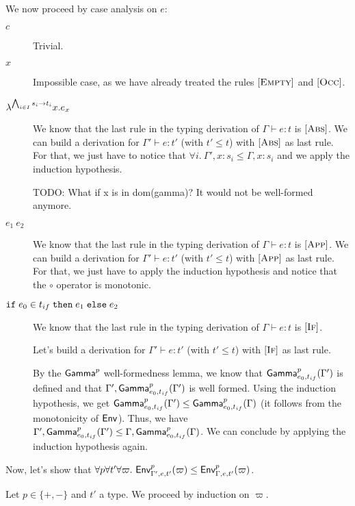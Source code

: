 \documentclass[a4paper]{article}
\theoremstyle{definition}
\begin{document}
        We now proceed by case analysis on $e$:
        \begin{description}
          \item[$c$] Trivial.
          \item[$x$] Impossible case, as we have already treated the rules $[\textsc{Empty}]$ and $[\textsc{Occ}]$.
          \item[$\lambda^{\bigwedge_{i\in I} s_i\to t_i}x.e_x$] We know that the last rule in the typing derivation of $\Gamma \vdash e:t$ is $[\textsc{Abs}]$.
          We can build a derivation for $\Gamma' \vdash e:t'$ (with $t'\leq t$) with $[\textsc{Abs}]$ as last rule.
          For that, we just have to notice that $\forall i.\ \Gamma',x:s_i \leq \Gamma,x:s_i$ and we apply the induction hypothesis.
          
          TODO: What if x is in dom(gamma)? It would not be well-formed anymore.

          \item[$e_1\ e_2$] We know that the last rule in the typing derivation of $\Gamma \vdash e:t$ is $[\textsc{App}]$.
          We can build a derivation for $\Gamma' \vdash e:t'$ (with $t'\leq t$) with $[\textsc{App}]$ as last rule.
          For that, we just have to apply the induction hypothesis and notice that the $\circ$ operator is monotonic.
          \item[$\texttt{if}\;e_0\in t_{if}\;\texttt{then}\;e_1\;\texttt{else}\;e_2$]
          We know that the last rule in the typing derivation of $\Gamma \vdash e:t$ is $[\textsc{If}]$.

          Let's build a derivation for $\Gamma' \vdash e:t'$ (with $t'\leq t$) with $[\textsc{If}]$ as last rule.

          By the $\textsf{Gamma}^{p}_{}$ well-formedness lemma, we know that $\textsf{Gamma}^{p}_{e_0,t_{if}}(\Gamma')$ is defined and that $\Gamma',\textsf{Gamma}^{p}_{e_0,t_{if}}(\Gamma')$ is well formed.
          Using the induction hypothesis, we get $\textsf{Gamma}^{p}_{e_0,t_{if}}(\Gamma') \leq \textsf{Gamma}^{p}_{e_0,t_{if}}(\Gamma)$ (it follows from the monotonicity of $\textsf{Env}^{}_{}$).
          Thus, we have $\Gamma',\textsf{Gamma}^{p}_{e_0,t_{if}}(\Gamma') \leq \Gamma,\textsf{Gamma}^{p}_{e_0,t_{if}}(\Gamma)$.
          We can conclude by applying the induction hypothesis again.\\
        \end{description}
    
        Now, let's show that $\forall p \forall t' \forall \varpi.\ \textsf{Env}^{p}_{\Gamma',e,t'} (\varpi) \leq \textsf{Env}^{p}_{\Gamma,e,t'} (\varpi)$.
    
        Let $p\in \{+,-\}$ and $t'$ a type.
        We proceed by induction on $\varpi$.
        
\end{document}
